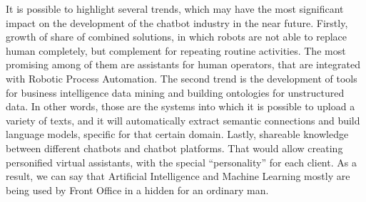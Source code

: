 It is possible to highlight several trends, which may have the most significant impact on the development of the chatbot industry in the near future.
Firstly, growth of share of combined solutions, in which robots are not able to replace human completely, but complement for repeating routine activities.
The most promising among of them are assistants for human operators, that are integrated with Robotic Process Automation.
The second trend is the development of tools for business intelligence data mining and building ontologies for unstructured data.
In other words, those are the systems into which it is possible to upload a variety of texts, and it will automatically
extract semantic connections and build language models, specific for that certain domain.
Lastly, shareable knowledge between different chatbots and chatbot platforms.
That would allow creating personified virtual assistants, with the special “personality” for each client.
As a result, we can say that Artificial Intelligence and Machine Learning mostly are being used by Front Office in a hidden for an ordinary man.
